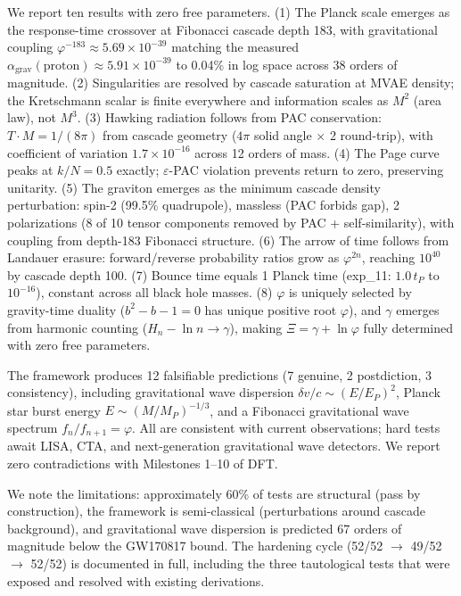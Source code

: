\documentclass[11pt,a4paper]{article}
\begin{document}
We report ten results with zero free parameters. (1) The Planck scale emerges as the response-time crossover at Fibonacci cascade depth 183, with gravitational coupling $\varphi^{-183} \approx 5.69 \times 10^{-39}$ matching the measured $\alpha_{\text{grav}}(\text{proton}) \approx 5.91 \times 10^{-39}$ to 0.04\% in log space across 38 orders of magnitude. (2) Singularities are resolved by cascade saturation at MVAE density; the Kretschmann scalar is finite everywhere and information scales as $M^2$ (area law), not $M^3$. (3) Hawking radiation follows from PAC conservation: $T \cdot M = 1/(8\pi)$ from cascade geometry ($4\pi$ solid angle $\times$ 2 round-trip), with coefficient of variation $1.7 \times 10^{-16}$ across 12 orders of mass. (4) The Page curve peaks at $k/N = 0.5$ exactly; $\varepsilon$-PAC violation prevents return to zero, preserving unitarity. (5) The graviton emerges as the minimum cascade density perturbation: spin-2 (99.5\% quadrupole), massless (PAC forbids gap), 2 polarizations (8 of 10 tensor components removed by PAC + self-similarity), with coupling from depth-183 Fibonacci structure. (6) The arrow of time follows from Landauer erasure: forward/reverse probability ratios grow as $\varphi^{2n}$, reaching $10^{40}$ by cascade depth 100. (7) Bounce time equals 1 Planck time (exp\_11: $1.0\,t_P$ to $10^{-16}$), constant across all black hole masses. (8) $\varphi$ is uniquely selected by gravity-time duality ($b^2 - b - 1 = 0$ has unique positive root $\varphi$), and $\gamma$ emerges from harmonic counting ($H_n - \ln n \to \gamma$), making $\Xi = \gamma + \ln\varphi$ fully determined with zero free parameters.

The framework produces 12 falsifiable predictions (7 genuine, 2 postdiction, 3 consistency), including gravitational wave dispersion $\delta v/c \sim (E/E_P)^2$, Planck star burst energy $E \sim (M/M_P)^{-1/3}$, and a Fibonacci gravitational wave spectrum $f_n/f_{n+1} = \varphi$. All are consistent with current observations; hard tests await LISA, CTA, and next-generation gravitational wave detectors. We report zero contradictions with Milestones 1–10 of DFT.

We note the limitations: approximately 60\% of tests are structural (pass by construction), the framework is semi-classical (perturbations around cascade background), and gravitational wave dispersion is predicted 67 orders of magnitude below the GW170817 bound. The hardening cycle (52/52 $\to$ 49/52 $\to$ 52/52) is documented in full, including the three tautological tests that were exposed and resolved with existing derivations.
\end{document}
